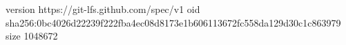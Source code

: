 version https://git-lfs.github.com/spec/v1
oid sha256:0bc4026d22239f222fba4ec08d8173e1b606113672fc558da129d30c1c863979
size 1048672
